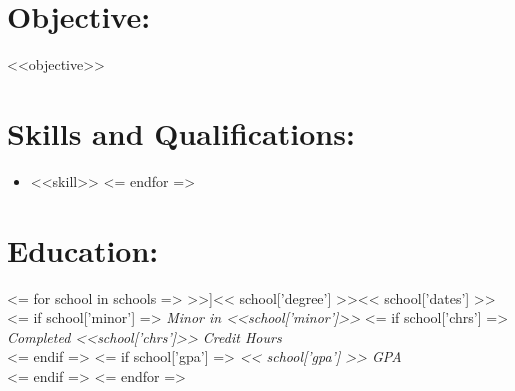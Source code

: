 \documentclass{resume}
\author{ <<author>> }
\begin{document}
\maketitle

\section{Objective:}

\small <<objective>> \normalsize

\section{Skills and Qualifications:}
\small\begin{itemize}
<= for skill in skills =>
    \item <<skill>>
<= endfor =>
\end{itemize}\normalsize

\section{Education:}

<= for school in schools =>
    \affiliation[<< school['place'] >>]{<< school['degree'] >>}{<< school['dates'] >>}
    <= if school['minor'] =>
        \textit{Minor in <<school['minor']>>}
    <= if school['chrs'] =>
        \emph{Completed <<school['chrs']>> Credit Hours}\\
    <= endif =>
    <= if school['gpa'] =>
        \emph{ << school['gpa'] >> GPA}\\
    <= endif =>
<= endfor =>
\end{document}
